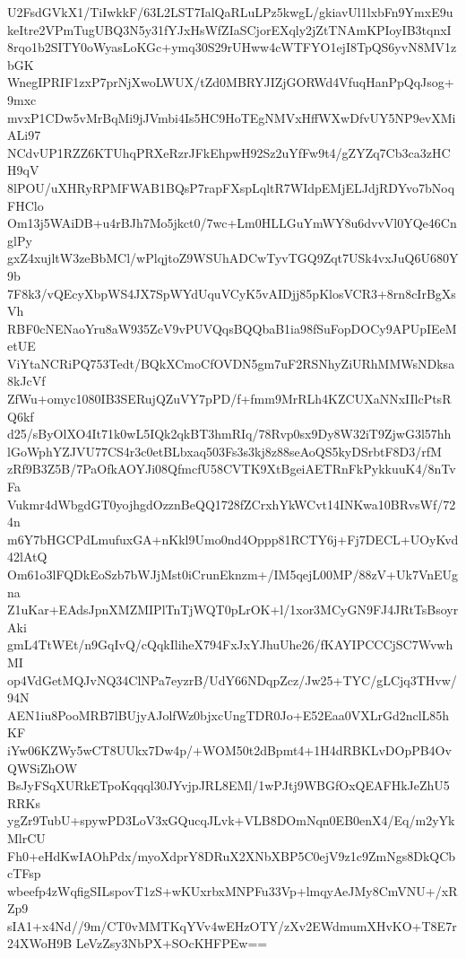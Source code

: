 U2FsdGVkX1/TiIwkkF/63L2LST7IalQaRLuLPz5kwgL/gkiavUl1lxbFn9YmxE9u
keItre2VPmTugUBQ3N5y31fYJxHsWfZIaSCjorEXqly2jZtTNAmKPIoyIB3tqnxI
8rqo1b2SITY0oWyasLoKGc+ymq30S29rUHww4cWTFYO1ejI8TpQS6yvN8MV1zbGK
WnegIPRIF1zxP7prNjXwoLWUX/tZd0MBRYJIZjGORWd4VfuqHanPpQqJsog+9mxc
mvxP1CDw5vMrBqMi9jJVmbi4Is5HC9HoTEgNMVxHffWXwDfvUY5NP9evXMiALi97
NCdvUP1RZZ6KTUhqPRXeRzrJFkEhpwH92Sz2uYfFw9t4/gZYZq7Cb3ca3zHCH9qV
8lPOU/uXHRyRPMFWAB1BQsP7rapFXspLqltR7WIdpEMjELJdjRDYvo7bNoqFHClo
Om13j5WAiDB+u4rBJh7Mo5jkct0/7wc+Lm0HLLGuYmWY8u6dvvVl0YQe46CnglPy
gxZ4xujltW3zeBbMCl/wPlqjtoZ9WSUhADCwTyvTGQ9Zqt7USk4vxJuQ6U680Y9b
7F8k3/vQEcyXbpWS4JX7SpWYdUquVCyK5vAIDjj85pKlosVCR3+8rn8cIrBgXsVh
RBF0cNENaoYru8aW935ZcV9vPUVQqsBQQbaB1ia98fSuFopDOCy9APUpIEeMetUE
ViYtaNCRiPQ753Tedt/BQkXCmoCfOVDN5gm7uF2RSNhyZiURhMMWsNDksa8kJcVf
ZfWu+omyc1080IB3SERujQZuVY7pPD/f+fmm9MrRLh4KZCUXaNNxIIlcPtsRQ6kf
d25/sByOlXO4It71k0wL5IQk2qkBT3hmRIq/78Rvp0sx9Dy8W32iT9ZjwG3l57hh
lGoWphYZJVU77CS4r3c0etBLbxaq503Fs3s3kj8z88seAoQS5kyDSrbtF8D3/rfM
zRf9B3Z5B/7PaOfkAOYJi08QfmcfU58CVTK9XtBgeiAETRnFkPykkuuK4/8nTvFa
Vukmr4dWbgdGT0yojhgdOzznBeQQ1728fZCrxhYkWCvt14INKwa10BRvsWf/724n
m6Y7bHGCPdLmufuxGA+nKkl9Umo0nd4Oppp81RCTY6j+Fj7DECL+UOyKvd42lAtQ
Om61o3lFQDkEoSzb7bWJjMst0iCrunEknzm+/IM5qejL00MP/88zV+Uk7VnEUgna
Z1uKar+EAdsJpnXMZMIPlTnTjWQT0pLrOK+l/1xor3MCyGN9FJ4JRtTsBsoyrAki
gmL4TtWEt/n9GqIvQ/cQqkIliheX794FxJxYJhuUhe26/fKAYIPCCCjSC7WvwhMI
op4VdGetMQJvNQ34ClNPa7eyzrB/UdY66NDqpZcz/Jw25+TYC/gLCjq3THvw/94N
AEN1iu8PooMRB7lBUjyAJolfWz0bjxcUngTDR0Jo+E52Eaa0VXLrGd2nclL85hKF
iYw06KZWy5wCT8UUkx7Dw4p/+WOM50t2dBpmt4+1H4dRBKLvDOpPB4OvQWSiZhOW
BsJyFSqXURkETpoKqqql30JYvjpJRL8EMl/1wPJtj9WBGfOxQEAFHkJeZhU5RRKs
ygZr9TubU+spywPD3LoV3xGQucqJLvk+VLB8DOmNqn0EB0enX4/Eq/m2yYkMlrCU
Fh0+eHdKwIAOhPdx/myoXdprY8DRuX2XNbXBP5C0ejV9z1c9ZmNgs8DkQCbcTFsp
wbeefp4zWqfigSILspovT1zS+wKUxrbxMNPFu33Vp+lmqyAeJMy8CmVNU+/xRZp9
sIA1+x4Nd//9m/CT0vMMTKqYVv4wEHzOTY/zXv2EWdmumXHvKO+T8E7r24XWoH9B
LeVzZsy3NbPX+SOcKHFPEw==
